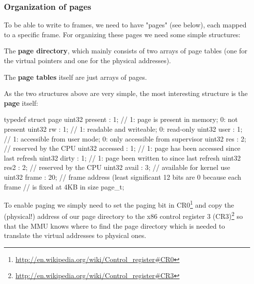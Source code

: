 \documentclass[11pt,a4paper]{scrartcl}
\begin{document}
\subsubsection{Organization of pages}
To be able to write to frames, we need to have "pages" (see below), each mapped to a specific frame.
For organizing these pages we need some simple structures:

The \textbf{page directory}, which mainly consists of two arrays of page tables (one for the virtual pointers and one for the physical addresses).

The \textbf{page tables} itself are just arrays of pages.

As the two structures above are very simple, the most interesting structure is the \textbf{page} itself:
\begin{code}
typedef struct page
{
	uint32 present  : 1;    // 1: page is present in memory; 0: not present
	uint32 rw       : 1;    // 1: readable and writeable; 0: read-only
	uint32 user     : 1;    // 1: accessible from user mode; 0: only accessible from supervisor
	uint32 res      : 2;    // reserved by the CPU
	uint32 accessed : 1;    // 1: page has been accessed since last refresh
	uint32 dirty    : 1;    // 1: page been written to since last refresh
	uint32 res2     : 2;    // reserved by the CPU
	uint32 avail    : 3;    // available for kernel use
	uint32 frame    : 20;   // frame address (least significant 12 bits are 0 because each frame
				// is fixed at 4KB in size  
} page_t;
\end{code}
To enable paging we simply need to set the paging bit in CR0\footnote{\url{http://en.wikipedia.org/wiki/Control_register\#CR0}} and copy the (physical!) address of our page directory to the x86 control register 3 (CR3)\footnote{\url{http://en.wikipedia.org/wiki/Control_register\#CR3}} so that the MMU knows where to find the page directory which is needed to translate the virtual addresses to physical ones.
\end{document}
